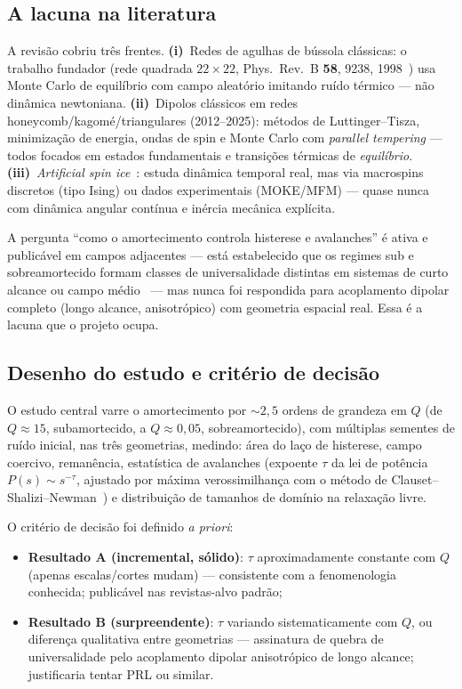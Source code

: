 \documentclass[11pt,a4paper]{article}
\begin{document}
\subsection{A lacuna na literatura}

A revisão cobriu três frentes. \textbf{(i)}~Redes de agulhas de bússola
clássicas: o trabalho fundador (rede quadrada $22\times22$, Phys.\ Rev.\
B \textbf{58}, 9238, 1998~\cite{prb1998}) usa Monte Carlo de equilíbrio
com campo aleatório imitando ruído térmico --- não dinâmica newtoniana.
\textbf{(ii)}~Dipolos clássicos em redes
honeycomb/kagomé/triangulares (2012--2025): métodos de
Luttinger--Tisza, minimização de energia, ondas de spin e Monte Carlo
com \emph{parallel tempering} --- todos focados em estados fundamentais
e transições térmicas de \emph{equilíbrio}. \textbf{(iii)}~\emph{Artificial
spin ice}~\cite{nisoli2013}: estuda dinâmica temporal real, mas via
macrospins discretos (tipo Ising) ou dados experimentais (MOKE/MFM) ---
quase nunca com dinâmica angular contínua e inércia mecânica explícita.

A pergunta ``como o amortecimento controla histerese e avalanches'' é
ativa e publicável em campos adjacentes --- está estabelecido que os
regimes sub e sobreamortecido formam classes de universalidade
distintas em sistemas de curto alcance ou campo médio~\cite{dahmen2011}
--- mas nunca foi respondida para acoplamento dipolar completo
(longo alcance, anisotrópico) com geometria espacial real. Essa é a
lacuna que o projeto ocupa.

\subsection{Desenho do estudo e critério de decisão}

O estudo central varre o amortecimento por $\sim 2{,}5$ ordens de
grandeza em $Q$ (de $Q \approx 15$, subamortecido, a $Q \approx 0{,}05$,
sobreamortecido), com múltiplas sementes de ruído inicial, nas três
geometrias, medindo: área do laço de histerese, campo coercivo,
remanência, estatística de avalanches (expoente $\tau$ da lei de
potência $P(s) \sim s^{-\tau}$, ajustado por máxima verossimilhança com
o método de Clauset--Shalizi--Newman~\cite{clauset2009}) e distribuição
de tamanhos de domínio na relaxação livre.

O critério de decisão foi definido \emph{a priori}:
\begin{itemize}
\item \textbf{Resultado A (incremental, sólido)}: $\tau$ aproximadamente
constante com $Q$ (apenas escalas/cortes mudam) --- consistente com a
fenomenologia conhecida; publicável nas revistas-alvo padrão;
\item \textbf{Resultado B (surpreendente)}: $\tau$ variando
sistematicamente com $Q$, ou diferença qualitativa entre geometrias ---
assinatura de quebra de universalidade pelo acoplamento dipolar
anisotrópico de longo alcance; justificaria tentar PRL ou similar.
\end{itemize}
\end{document}
